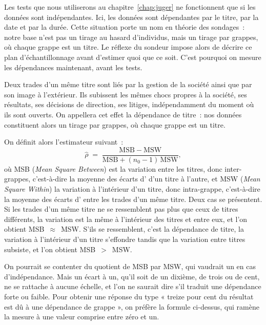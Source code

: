 
Les tests que nous utiliserons au chapitre~\ref{chap:juger} ne
fonctionnent que si les données sont indépendantes. Ici, les données
sont dépendantes par le titre, par la date et par la durée. Cette
situation porte un nom en théorie des sondages~: notre base n'est pas un
tirage au hasard d'individus, mais un tirage par grappes, où chaque
grappe est un titre. Le réflexe du sondeur impose alors de décrire ce
plan d'échantillonnage avant d'estimer quoi que ce soit. C'est pourquoi
on mesure les dépendances maintenant, avant les tests.


Deux trades d'un même titre sont liés par la gestion de la société ainsi
que par son image à l'extérieur. Ils subissent les mêmes chocs propres à
la société, ses résultats, ses décisions de direction, ses litiges,
indépendamment du moment où ils sont ouverts. On appellera cet effet la
dépendance de titre~: nos données constituent alors un tirage par
grappes, où chaque grappe est un titre.

On définit alors l'estimateur suivant~:
\[
  \hat\rho \;=\; \frac{\mathrm{MSB}-\mathrm{MSW}}
                      {\mathrm{MSB} + (n_0 - 1)\,\mathrm{MSW}},
\]
où MSB (\emph{Mean Square Between}) est la variation entre les titres,
donc inter-grappes, c'est-à-dire la moyenne des écarts d'\edgevar{} d'un
titre à l'autre, et MSW (\emph{Mean Square Within}) la variation à
l'intérieur d'un titre, donc intra-grappe, c'est-à-dire la moyenne des
écarts d'\edgevar{} entre les trades d'un même titre. Deux cas se
présentent. Si les trades d'un même titre ne se ressemblent pas plus que
ceux de titres différents, la variation est la même à l'intérieur des
titres et entre eux, et l'on obtient MSB~$\approx$~MSW. S'ils se
ressemblent, c'est la dépendance de titre, la variation à l'intérieur
d'un titre s'effondre tandis que la variation entre titres subsiste, et
l'on obtient MSB~$>$~MSW.

On pourrait se contenter du quotient de MSB par MSW, qui vaudrait un en
cas d'indépendance. Mais un écart à un, qu'il soit de un dixième, de
trois ou de cent, ne se rattache à aucune échelle, et l'on ne saurait
dire s'il traduit une dépendance forte ou faible. Pour obtenir une
réponse du type « treize pour cent du résultat est dû à une dépendance
de grappe », on préfère la formule ci-dessus, qui ramène la mesure à une
valeur comprise entre zéro et un.

